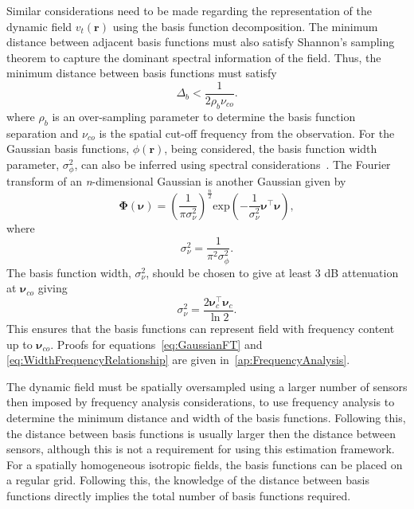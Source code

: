 \documentclass[12pt]{iopart}
\begin{document}
Similar considerations need to be made regarding the representation of the dynamic field $v_t(\mathbf{r})$ using the basis function decomposition. The minimum distance between adjacent basis functions must also satisfy Shannon's sampling theorem to capture the dominant spectral information of the field. Thus, the minimum distance between basis functions must satisfy 
\begin{equation}\label{eq:BasisFunctionSeparation}
	\Delta_b < \frac{1}{2\rho_b\nu_{co}}. 
\end{equation}
where $\rho_b$ is an over-sampling parameter to determine the basis function separation and $\nu_{co}$ is the spatial cut-off frequency from the observation. For the Gaussian basis functions, $\phi(\mathbf{r})$, being considered, the basis function width parameter, $\sigma_{\phi}^2$, can also be inferred using spectral considerations~\cite{Sanner1992,Scerri2009}. The Fourier transform of an \textit{n}-dimensional Gaussian is another Gaussian given by
\begin{equation}\label{eq:GaussianFT}
\boldsymbol\Phi(\boldsymbol \nu)=\left(\frac{1}{\pi\sigma_{\nu}^2}\right)^{\frac{n}{2}}\mathrm{exp}\left(-\frac{1}{\sigma_{\nu}^2}\boldsymbol\nu^\top \boldsymbol\nu\right),
\end{equation}
where 
\begin{equation}\label{eq:GaussianFTWidth}
	\sigma^2_{\nu} = \frac{1}{\pi^2\sigma_{\phi}^2}. 
\end{equation}
The basis function width, $\sigma^2_{\nu}$, should be chosen to give at least 3 dB attenuation at $\boldsymbol\nu_{co}$ giving
\begin{equation}\label{eq:WidthFrequencyRelationship}
 \sigma^2_{\nu}=\frac{2\boldsymbol\nu_c^\top \boldsymbol\nu_c}{\ln 2}.
\end{equation}
This ensures that the basis functions can represent field with frequency content up to $\boldsymbol\nu_{co} $. Proofs for equations~\ref{eq:GaussianFT} and \ref{eq:WidthFrequencyRelationship} are given in~\ref{ap:FrequencyAnalysis}.

The dynamic field must be spatially oversampled using a larger number of sensors then imposed by frequency analysis considerations, to use frequency analysis to determine the minimum distance and width of the basis functions. Following this, the distance between basis functions is usually larger then the distance between sensors, although this is not a requirement for using this estimation framework. For a spatially homogeneous isotropic fields, the basis functions can be placed on a regular grid. Following this, the knowledge of the distance between basis functions directly implies the total number of basis functions required.
\end{document}
